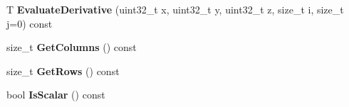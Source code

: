 \begin{DoxyCompactItemize}
\item 
\hypertarget{structatl_1_1_variable_matrix_a2a1af09f111aed65d69a44651cb36ced}{T {\bfseries Evaluate\+Derivative} (uint32\+\_\+t x, uint32\+\_\+t y, uint32\+\_\+t z, size\+\_\+t i, size\+\_\+t j=0) const }\label{structatl_1_1_variable_matrix_a2a1af09f111aed65d69a44651cb36ced}

\item 
\hypertarget{structatl_1_1_variable_matrix_aa23031ddb3becdaa0c36717bd9b44f5c}{size\+\_\+t {\bfseries Get\+Columns} () const }\label{structatl_1_1_variable_matrix_aa23031ddb3becdaa0c36717bd9b44f5c}

\item 
\hypertarget{structatl_1_1_variable_matrix_a256ec551bfd19efc13d89a9b993d992a}{size\+\_\+t {\bfseries Get\+Rows} () const }\label{structatl_1_1_variable_matrix_a256ec551bfd19efc13d89a9b993d992a}

\item 
\hypertarget{structatl_1_1_variable_matrix_ab08d56cb74dda075d1764865f3e8fd07}{bool {\bfseries Is\+Scalar} () const }\label{structatl_1_1_variable_matrix_ab08d56cb74dda075d1764865f3e8fd07}


\end{DoxyCompactItemize}
